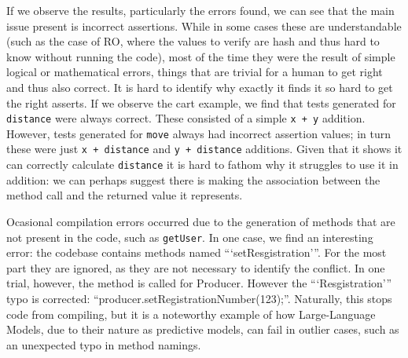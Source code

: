 If we observe the results, particularly the errors found, we can see that the main issue present
is incorrect assertions. While in some cases these are understandable (such as the case of RO,
where the values to verify are hash and thus hard to know without running the code), most of the time
they were the result of simple logical or mathematical errors, things that are trivial for a human to get right
and thus also correct.
It is hard to identify why exactly it finds it so hard to get the right asserts. If we observe the cart example,
we find that tests generated for \texttt{distance} were always correct. These consisted of a simple \texttt{x + y} addition.
However, tests generated for \texttt{move} always had incorrect assertion values; in turn these were just \texttt{x + distance} and \texttt{y + distance} additions.
Given that it shows it can correctly calculate \texttt{distance} it is hard to fathom why it struggles
to use it in addition: we can perhaps suggest there is making the association between the method call and the returned value it represents.

Ocasional compilation errors occurred due to the generation of methods that are not present in the code, such as \texttt{getUser}.
In one case, we find an interesting error: the codebase contains methods named ```setResgistration'''.
For the most part they are ignored, as they are not necessary to identify the conflict. In one trial, however,
the method is called for Producer. However the ```Resgistration''' typo is corrected: ``producer.setRegistrationNumber(123);''.
Naturally, this stops code from compiling, but it is a noteworthy example of how Large-Language Models, due to their nature as
predictive models, can fail in outlier cases, such as an unexpected typo in method namings.

